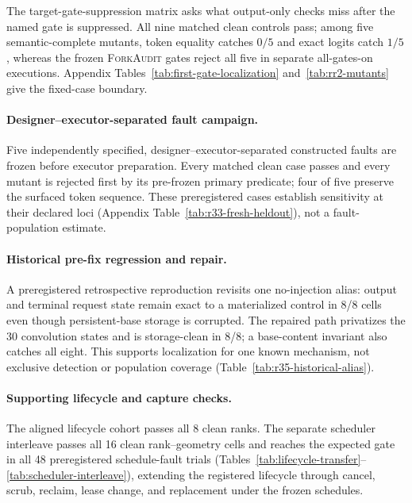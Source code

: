 \documentclass{article}
\newcommand{\method}{\textsc{ForkAudit}}
\begin{document}
The target-gate-suppression matrix asks what output-only checks miss after the
named gate is suppressed.  All nine matched clean controls pass; among five
semantic-complete mutants, token equality catches $0/5$ and exact logits catch
$1/5$, whereas the frozen \method{} gates reject all five in separate
all-gates-on executions.  Appendix Tables~\ref{tab:first-gate-localization}
and~\ref{tab:rr2-mutants} give the fixed-case boundary.

\paragraph{Designer--executor-separated fault campaign.}
Five independently specified, designer--executor-separated constructed faults
are frozen before executor preparation.  Every matched clean case passes and
every mutant is rejected first by its pre-frozen primary predicate; four of
five preserve the surfaced token sequence.  These preregistered cases establish
sensitivity at their declared loci (Appendix
Table~\ref{tab:r33-fresh-heldout}), not a fault-population estimate.

\paragraph{Historical pre-fix regression and repair.}
A preregistered retrospective reproduction revisits one no-injection alias:
output and terminal request state remain exact to a materialized control in
8/8 cells even though persistent-base storage is corrupted.  The repaired path
privatizes the 30 convolution states and is storage-clean in 8/8; a base-content
invariant also catches all eight.  This supports localization for one known
mechanism, not exclusive detection or population coverage
(Table~\ref{tab:r35-historical-alias}).



\paragraph{Supporting lifecycle and capture checks.}

The aligned lifecycle cohort passes all 8 clean ranks.  The separate scheduler
interleave passes all 16 clean rank--geometry cells and reaches the expected
gate in all 48 preregistered schedule-fault trials
(Tables~\ref{tab:lifecycle-transfer}--\ref{tab:scheduler-interleave}), extending
the registered lifecycle through cancel, scrub, reclaim, lease change, and
replacement under the frozen schedules.
\end{document}
